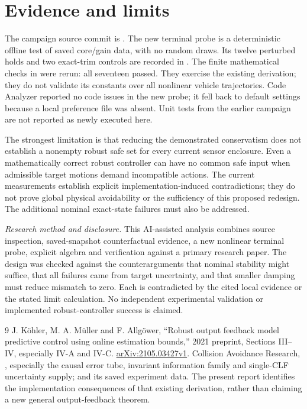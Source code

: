 \documentclass[11pt]{article}
\begin{document}
\section{Evidence and limits}
The campaign source commit is
. The new terminal probe is a
deterministic offline test of saved core/gain data, with no random draws.
Its twelve perturbed holds and two exact-trim controls are recorded in
.
The finite mathematical checks in 
were rerun: all seventeen passed. They exercise the existing derivation;
they do not validate its constants over all nonlinear vehicle trajectories.
Code Analyzer reported no code issues in the new probe; it fell back to
default settings because a local preference file was absent. Unit tests from
the earlier campaign are not reported as newly executed here.

The strongest limitation is that reducing the demonstrated conservatism
does not establish a nonempty robust safe set for every current sensor
enclosure. Even a mathematically correct robust controller can have no
common safe input when admissible target motions demand incompatible
actions. The current measurements establish explicit implementation-induced
contradictions; they do not prove global physical avoidability or the
sufficiency of this proposed redesign. The additional nominal exact-state
failures must also be addressed.

\textit{Research method and disclosure.} This AI-assisted analysis combines
source inspection, saved-snapshot counterfactual evidence, a new nonlinear
terminal probe, explicit algebra and verification against a primary research
paper. The design was checked against the counterarguments that nominal
stability might suffice, that all failures came from target uncertainty, and
that smaller damping must reduce mismatch to zero. Each is contradicted by
the cited local evidence or the stated limit calculation. No independent
experimental validation or implemented robust-controller success is claimed.

\begin{thebibliography}{9}
 J. K\"ohler, M. A. M\"uller and F. Allg\"ower,
``Robust output feedback model predictive control using online estimation
bounds,'' 2021 preprint, Sections III--IV, especially IV-A and IV-C.
\href{https://arxiv.org/html/2105.03427v1}{arXiv:2105.03427v1}.
 Collision Avoidance Research,
, especially the causal
error tube, invariant information family and single-CLF uncertainty supply;
 and its saved experiment
data. The present report identifies the implementation consequences of that
existing derivation, rather than claiming a new general output-feedback theorem.
\end{thebibliography}
\end{document}
